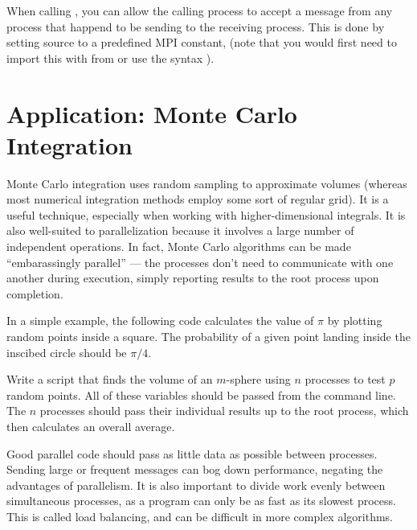 \begin{info}
When calling , you can allow the calling process to accept a message from any process that happend to be sending to the receiving process. This is done by setting source to a predefined MPI constant,  (note that you would first need to import this with from  or use the syntax ).
\end{info}

\section*{Application: Monte Carlo Integration}
Monte Carlo integration uses random sampling to approximate volumes (whereas most numerical integration methods employ some sort of regular grid). It is a useful technique, especially when working with higher-dimensional integrals. It is also well-suited to parallelization because it involves a large number of independent operations. In fact, Monte Carlo algorithms can be made ``embarassingly parallel'' --- the processes don't need to communicate with one another during execution, simply reporting results to the root process upon completion.

In a simple example, the following code calculates the value of $\pi$ by plotting random points inside a square. The probability of a given point landing inside the inscibed circle should be $\pi/4$.


\begin{problem}
Write a script that finds the volume of an $m$-sphere using $n$ processes to test $p$ random points. All of these variables should be passed from the command line. The $n$ processes should pass their individual results up to the root process, which then calculates an overall average. 
\end{problem}

\begin{info}
Good parallel code should pass as little data as possible between processes. Sending large or frequent messages can bog down performance, negating the advantages of parallelism. It is also important to divide work evenly between simultaneous processes, as a program can only be as fast as its slowest process. This is called load balancing, and can be difficult in more complex algorithms.
\end{info}
